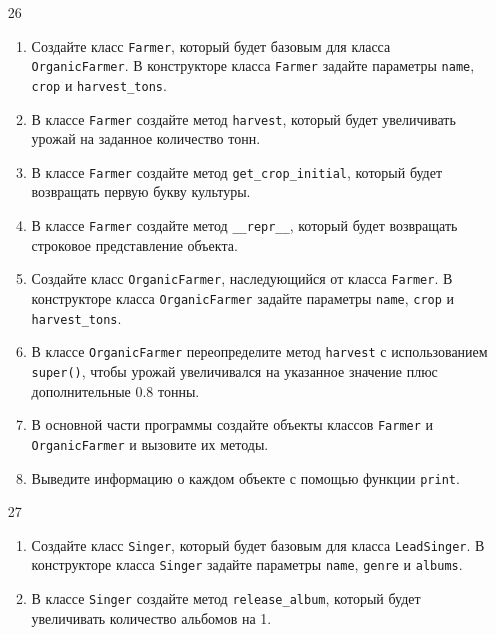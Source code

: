 \begin{enumerate}
\item[26] 
\begin{enumerate}[leftmargin=*]
    \item Создайте класс \texttt{Farmer}, который будет базовым для класса \texttt{OrganicFarmer}. В конструкторе класса \texttt{Farmer} задайте параметры \texttt{name}, \texttt{crop} и \texttt{harvest\_tons}.
    
    \item В классе \texttt{Farmer} создайте метод \texttt{harvest}, который будет увеличивать урожай на заданное количество тонн.
    
    \item В классе \texttt{Farmer} создайте метод \texttt{get\_crop\_initial}, который будет возвращать первую букву культуры.
    
    \item В классе \texttt{Farmer} создайте метод \texttt{\_\_repr\_\_}, который будет возвращать строковое представление объекта.
    
    \item Создайте класс \texttt{OrganicFarmer}, наследующийся от класса \texttt{Farmer}. В конструкторе класса \texttt{OrganicFarmer} задайте параметры \texttt{name}, \texttt{crop} и \texttt{harvest\_tons}.
    
    \item В классе \texttt{OrganicFarmer} переопределите метод \texttt{harvest} с использованием \texttt{super()}, чтобы урожай увеличивался на указанное значение плюс дополнительные 0.8 тонны.
    
    \item В основной части программы создайте объекты классов \texttt{Farmer} и \texttt{OrganicFarmer} и вызовите их методы.
    
    \item Выведите информацию о каждом объекте с помощью функции \texttt{print}.
\end{enumerate}

\item[27] 
\begin{enumerate}[leftmargin=*]
    \item Создайте класс \texttt{Singer}, который будет базовым для класса \texttt{LeadSinger}. В конструкторе класса \texttt{Singer} задайте параметры \texttt{name}, \texttt{genre} и \texttt{albums}.
    
    \item В классе \texttt{Singer} создайте метод \texttt{release\_album}, который будет увеличивать количество альбомов на 1.
    

\end{enumerate}
\end{enumerate}
